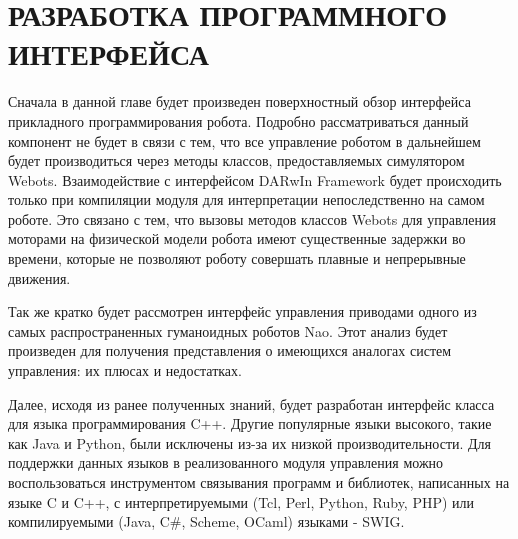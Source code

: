 \chapter{РАЗРАБОТКА ПРОГРАММНОГО ИНТЕРФЕЙСА}

Сначала в данной главе будет произведен поверхностный обзор интерфейса прикладного программирования робота. Подробно рассматриваться данный компонент не будет в связи с тем, что все управление роботом в дальнейшем будет производиться через методы классов, предоставляемых симулятором Webots. Взаимодействие с интерфейсом DARwIn Framework будет происходить только при компиляции модуля для интерпретации непоследственно на самом роботе. Это связано с тем, что вызовы методов классов Webots для управления моторами на физической модели робота имеют существенные задержки во времени, которые не позволяют роботу совершать плавные и непрерывные движения.

Так же кратко будет рассмотрен интерфейс управления приводами одного из самых распространенных гуманоидных роботов Nao. Этот анализ будет произведен для получения представления о имеющихся аналогах систем управления: их плюсах и недостатках.

Далее, исходя из ранее полученных знаний, будет разработан интерфейс класса для языка программирования C++. Другие популярные языки высокого, такие как Java и Python, были исключены из-за их низкой производительности. Для поддержки данных языков в реализованного модуля управления можно воспользоваться инструментом связывания программ и библиотек, написанных на языке C и C++, с интерпретируемыми (Tcl, Perl, Python, Ruby, PHP) или компилируемыми (Java, C\#, Scheme, OCaml) языками - SWIG.


